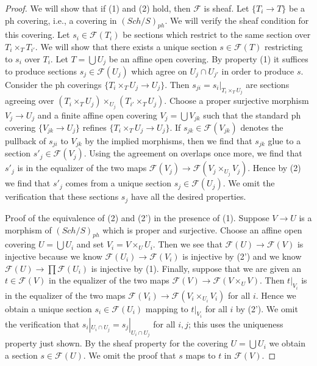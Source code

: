 \documentclass{stacks-project}
\theoremstyle{plain}
\theoremstyle{definition}
\theoremstyle{remark}
\numberwithin{equation}{subsection}
\def\Sch{\mathit{Sch}}
\begin{document}
\begin{proof}
We will show that if (1) and (2) hold, then $\mathcal{F}$ is sheaf.
Let $\{T_i \to T\}$ be a ph covering, i.e., a covering in $(\Sch/S)_{ph}$.
We will verify the sheaf condition for this covering.
Let $s_i \in \mathcal{F}(T_i)$ be sections which restrict to the same
section over $T_i \times_T T_{i'}$. We will show that there exists a
unique section $s \in \mathcal{F}(T)$ restricting to $s_i$ over $T_i$.
Let $T = \bigcup U_j$ be an affine open covering.
By property (1) it suffices to produce sections $s_j \in \mathcal{F}(U_j)$
which agree on $U_j \cap U_{j'}$ in order to produce $s$.
Consider the ph coverings $\{T_i \times_T U_j \to U_j\}$.
Then $s_{ji} = s_i|_{T_i \times_T U_j}$ are sections agreeing
over $(T_i \times_T U_j) \times_{U_j} (T_{i'} \times_T U_j)$.
Choose a proper surjective morphism $V_j \to U_j$ and a finite affine
open covering $V_j = \bigcup V_{jk}$ such that the standard ph covering
$\{V_{jk} \to U_j\}$ refines $\{T_i \times_T U_j \to U_j\}$.
If $s_{jk} \in \mathcal{F}(V_{jk})$
denotes the pullback of $s_{ji}$ to $V_{jk}$ by the
implied morphisms, then we find that $s_{jk}$ glue to a section
$s'_j \in \mathcal{F}(V_j)$. Using the agreement on overlaps
once more, we find that $s'_j$ is in the equalizer of the two
maps $\mathcal{F}(V_j) \to \mathcal{F}(V_j \times_{U_j} V_j)$.
Hence by (2) we find that $s'_j$ comes from a unique section
$s_j \in \mathcal{F}(U_j)$. We omit the verification that these
sections $s_j$ have all the desired properties.

\medskip\noindent
Proof of the equivalence of (2) and (2') in the presence of (1).
Suppose $V \to U$ is a morphism of $(\Sch/S)_{ph}$ which is
proper and surjective. Choose an
affine open covering $U = \bigcup U_i$ and set $V_i = V \times_U U_i$.
Then we see that $\mathcal{F}(U) \to \mathcal{F}(V)$
is injective because we know $\mathcal{F}(U_i) \to \mathcal{F}(V_i)$
is injective by (2') and we know $\mathcal{F}(U) \to \prod \mathcal{F}(U_i)$
is injective by (1). Finally, suppose that we are given an
$t \in \mathcal{F}(V)$ in the equalizer of the two maps
$\mathcal{F}(V) \to \mathcal{F}(V \times_U V)$.
Then $t|_{V_i}$ is in the equalizer of the two maps
$\mathcal{F}(V_i) \to \mathcal{F}(V_i \times_{U_i} V_i)$
for all $i$. Hence we obtain a unique section $s_i \in \mathcal{F}(U_i)$
mapping to $t|_{V_i}$ for all $i$ by (2').
We omit the verification that $s_i|_{U_i \cap U_j} = s_j|_{U_i \cap U_j}$
for all $i, j$; this uses the uniqueness property just shown.
By the sheaf property for the covering $U = \bigcup U_i$ we obtain
a section $s \in \mathcal{F}(U)$. We omit the proof that $s$
maps to $t$ in $\mathcal{F}(V)$.
\end{proof}
\end{document}
